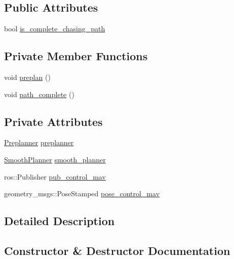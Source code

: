 \subsection*{Public Attributes}
\begin{DoxyCompactItemize}
\item 
bool \hyperlink{class_chaser_a53af032471ad6bdc828c4eae78085813}{is\+\_\+complete\+\_\+chasing\+\_\+path}
\end{DoxyCompactItemize}
\subsection*{Private Member Functions}
\begin{DoxyCompactItemize}
\item 
void \hyperlink{class_chaser_a5169e2a07c5d86d144880be3d9c7d6b9}{preplan} ()
\item 
void \hyperlink{class_chaser_aa70b57b1d92a22f56199ee3d0460a4f7}{path\+\_\+complete} ()
\end{DoxyCompactItemize}
\subsection*{Private Attributes}
\begin{DoxyCompactItemize}
\item 
\hyperlink{class_preplanner}{Preplanner} \hyperlink{class_chaser_a090edb4f4bdb9da847f0980d3b188c57}{preplanner}
\item 
\hyperlink{class_smooth_planner}{Smooth\+Planner} \hyperlink{class_chaser_aab300ace64ce35c982c546cfce13f476}{smooth\+\_\+planner}
\item 
ros\+::\+Publisher \hyperlink{class_chaser_a6eae070c2bad84e685bee6ce046245e3}{pub\+\_\+control\+\_\+mav}
\item 
geometry\+\_\+msgs\+::\+Pose\+Stamped \hyperlink{class_chaser_aadbc227c0bffe031c6411f8e00330f3f}{pose\+\_\+control\+\_\+mav}
\end{DoxyCompactItemize}


\subsection{Detailed Description}


\subsection{Constructor \& Destructor Documentation}
